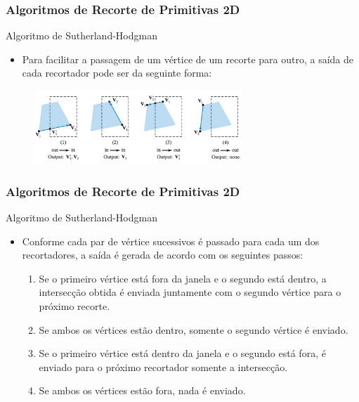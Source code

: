 \documentclass{beamer}
\begin{document}
\begin{frame}
\frametitle{Algoritmos de Recorte de Primitivas 2D}

	\begin{block}{Algoritmo de Sutherland-Hodgman}
		\begin{itemize}
			\item Para facilitar a passagem de um vértice de um recorte para outro, a saída de cada recortador pode ser da seguinte forma:	 
		\end{itemize}
	\end{block}
	\begin{figure}[!h]
			\begin{center}
				\includegraphics[width=0.7\textwidth]{Figures/RecPol3}
			\end{center}
	\end{figure}
\end{frame}

\begin{frame}
\frametitle{Algoritmos de Recorte de Primitivas 2D}

	\begin{block}{Algoritmo de Sutherland-Hodgman}
		\begin{itemize}
			\item Conforme cada par de vértice sucessivos é passado para cada um dos recortadores, a saída é gerada de acordo com os seguintes passos:
			\begin{enumerate}
				\item Se o primeiro vértice está fora da janela e o segundo está dentro, a intersecção obtida é enviada juntamente com o segundo vértice para o próximo recorte.
				\item Se ambos os vértices estão dentro, somente o segundo vértice é enviado.
				\item Se o primeiro vértice está dentro da janela e o segundo está fora, é enviado para o próximo recortador somente a intersecção.
				\item Se ambos os vértices estão fora, nada é enviado.
			\end{enumerate}			 
		\end{itemize}
	\end{block}
\end{frame}
\end{document}
